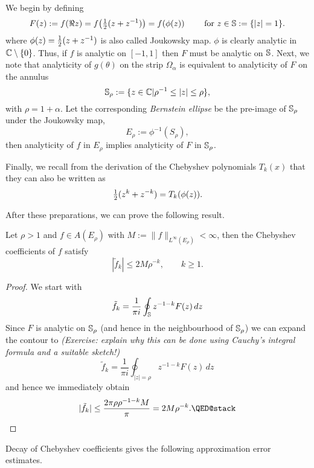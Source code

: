 We begin by defining
\[
   F(z) := f(\Re z) = f\big( {\textstyle \frac{1}{2}}(z+z^{-1}) \big)
         = f(\phi(z)) \qquad \text{ for } z \in \mathbb{S} := \{|z|=1\}.
\]
%
where $\phi(z) = {\textstyle \frac{1}{2}} (z+z^{-1})$ is also called Joukowsky map. $\phi$ is
clearly analytic in $\mathbb{C} \setminus \{0\}$. Thus, if $f$ is analytic on $[-1,1]$
then $F$ must be analytic on $\mathbb{S}$. Next, we note that analyticity of $g(\theta)$
on the strip $\Omega_\alpha$ is equivalent to analyticity of $F$ on the annulus
%
\[
   \mathbb{S}_\rho := \{ z \in \mathbb{C} | \rho^{-1} \leq |z| \leq \rho \},
\]
%
with $\rho = 1+\alpha$. Let the corresponding {\em Bernstein ellipse} be the
pre-image of $\mathbb{S}_\rho$ under the Joukowsky map,
%
\[
   E_\rho := \phi^{-1}(S_\rho),
\]
%
then analyticity of $f$ in $E_\rho$ implies analyticity of $F$ in $\mathbb{S}_\rho$.

Finally, we recall from the derivation of the Chebyshev polynomials $T_k(x)$
that they can also be written as
\[
   {\textstyle \frac{1}{2}} (z^k + z^{-k}) = T_k(\phi(z)).
\]

After these preparations, we can prove the following result.


\begin{theorem}
   Let $\rho > 1$ and $f \in A(E_\rho)$ with  $M := \|f\|_{L^\infty(E_\rho)} <
   \infty$, then the Chebyshev coefficients of $f$ satisfy
   \[
      |\tilde{f}_k| \leq 2 M \rho^{-k}, \qquad k \geq 1.
   \]
\end{theorem}
\begin{proof}
   We start with
   \[
      \tilde{f}_k = \frac{1}{\pi i} \oint_{\mathbb{S}} z^{-1-k} F(z) \, dz
   \]
   Since $F$ is analytic on $\mathbb{S}_\rho$ (and hence in the neighbourhood of $\mathbb{S}_\rho$)
   we can expand the contour to {\it (Exercise: explain why this can be done using
   Cauchy's integral formula and a suitable sketch!)}
   \[
      \tilde{f}_k = \frac{1}{\pi i} \oint_{|z|=\rho} z^{-1-k} F(z) \, dz
   \]
   and hence we immediately obtain
   \[
      |\tilde{f}_k| \leq \frac{2\pi \rho \rho^{-1-k} M}{\pi} = 2 M \rho^{-k}.
      \qedhere
   \]
\end{proof}

Decay of Chebyshev coefficients gives the following approximation error
estimates.

